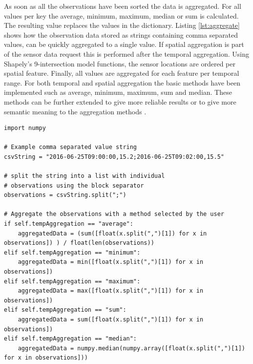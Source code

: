 As soon as all the observations have been sorted the data is aggregated. For all values per key the average, minimum, maximum, median or sum is calculated. The resulting value replaces the values in the dictionary. Listing \ref{lst:aggregate} shows how the observation data stored as strings containing comma separated values, can be quickly aggregated to a single value. If spatial aggregation is part of the sensor data request this is performed after the temporal aggregation. Using Shapely's 9-intersection model functions, the sensor locations are ordered per spatial feature. Finally, all values are aggregated for each feature per temporal range. For both temporal and spatial aggregation the basic methods have been implemented such as average, minimum, maximum, sum and median. These methods can be further extended to give more reliable results \citep{SW:Ganesan} or to give more semantic meaning to the aggregation methods \citep{SSW:Stasch4}.         


\begin{lstlisting}[float,caption={Script that performs basic temporal aggregation methods on a comma separated value string}, label={lst:aggregate}]
import numpy

# Example comma separated value string 
csvString = "2016-06-25T09:00:00,15.2;2016-06-25T09:02:00,15.5"

# split the string into a list with individual 
# observations using the block separator 
observations = csvString.split(";")

# Aggregate the observations with a method selected by the user
if self.tempAggregation == "average":
	aggregatedData = (sum([float(x.split(",")[1]) for x in observations]) ) / float(len(observations))
elif self.tempAggregation == "minimum":
	aggregatedData = min([float(x.split(",")[1]) for x in observations])
elif self.tempAggregation == "maximum":
	aggregatedData = max([float(x.split(",")[1]) for x in observations])
elif self.tempAggregation == "sum":
	aggregatedData = sum([float(x.split(",")[1]) for x in observations])
elif self.tempAggregation == "median":
	aggregatedData = numpy.median(numpy.array([float(x.split(",")[1]) for x in observations]))
\end{lstlisting}


